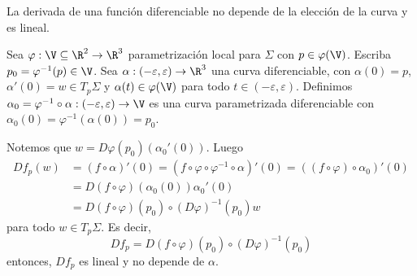 \documentclass{article}
\begin{document}
\begin{prop}
    La derivada de una función diferenciable no depende de la elección de la curva y es lineal.
\end{prop}
\begin{dem}
    Sea $\varphi:\V\subseteq\R^{2}\to\R^{3}$ parametrización local para $\Sigma$ con 
    $p\in\varphi(\V)$. Escriba $p_{0}=\varphi^{-1}(p)\in\V$. Sea $\alpha:
    (-\varepsilon, \varepsilon)\to\R^{3}$ una curva diferenciable, con $\alpha(0)=p$, 
    $\alpha'(0)=w\in T_{p}\Sigma$ y $\alpha(t)\in\varphi(\V)$ para todo 
    $t\in(-\varepsilon, \varepsilon)$. Definimos 
    $\alpha_{0}=\varphi^{-1}\circ\alpha:(-\varepsilon, \varepsilon)\to\V$ es una curva parametrizada
    diferenciable con $\alpha_{0}(0)=\varphi^{-1}(\alpha(0))=p_{0}$.
    \vspace{4mm}

    \noindent Notemos que $w=D\varphi(p_{0})(\alpha_{0}'(0))$. Luego
    \begin{align*}
        Df_{p}(w) &= (f\circ\alpha)'(0)=(f\circ\varphi\circ\varphi^{-1}\circ\alpha)'(0)=
        ((f\circ\varphi)\circ\alpha_{0})'(0) \\
        &= D(f\circ\varphi)(\alpha_{0}(0))\alpha_{0}'(0) \\
        &= D(f\circ\varphi)(p_{0})\circ (D\varphi)^{-1}(p_{0})w
    \end{align*}
    para todo $w\in T_{p}\Sigma$. Es decir,
    \begin{equation*}
        Df_{p}=D(f\circ\varphi)(p_{0})\circ (D\varphi)^{-1}(p_{0})
    \end{equation*}
    entonces, $Df_{p}$ es lineal y no depende de $\alpha$.
\end{dem}
\end{document}
